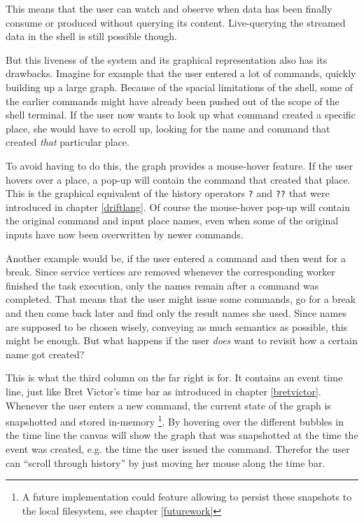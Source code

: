 This means that the user can watch and observe when data has been
finally consume or produced without querying its content. Live-querying
the streamed data in the shell is still possible though.
\newline

But this liveness of the system and its graphical representation
also has its drawbacks. Imagine for example that the user entered
a lot of commands, quickly building up a large graph. Because
of the spacial limitations of the shell, some of the earlier commands
might have already been pushed out of the scope of the shell terminal.
If the user now wants to look up what command created a specific
place, she would have to scroll up, looking for the name and command
that created \textit{that} particular place.

To avoid having to do this, the graph provides a mouse-hover feature.
If the user hovers over a place, a pop-up will contain the command that
created that place. This is the graphical equivalent of the
history operators \texttt{?} and \texttt{??} that were introduced
in chapter \ref{driftlang}. Of course the mouse-hover pop-up will
contain the original command and input place names, even when
some of the original inputs have now been overwritten by newer
commands.

Another example would be, if the user entered a command and then
went for a break. Since service vertices are removed whenever
the corresponding worker finished the task execution, only
the names remain after a command was completed.
That means that the user might issue some commands, go for
a break and then come back later and find only the result
names she used. Since names are supposed to be chosen wisely, conveying
as much semantics as possible, this might be enough.
But what happens if the user \textit{does} want to revisit
how a certain name got created?

This is what the third column on the far right is for. It contains
an event time line, just like Bret Victor's time bar as introduced
in chapter \ref{bretvictor}. Whenever the user enters a new command,
the current state of the graph is snapshotted and stored in-memory
\footnote{A future implementation could feature allowing to
persist these snapshots to the local filesystem, see chapter
\ref{futurework}}.
By hovering over the different bubbles in the time line the
canvas will show the graph that was snapshotted at the time
the event was created, e.g. the time the user issued the command.
Therefor the user can ``scroll through history'' by just moving
her mouse along the time bar.

